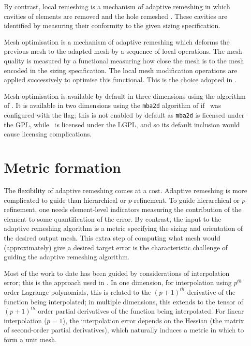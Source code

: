 By contrast, local remeshing is a mechanism of adaptive remeshing in which cavities of elements are removed
and the hole remeshed \citep{hassan1998}. These cavities are identified by measuring
their conformity to the given sizing specification.

Mesh optimisation is a mechanism of adaptive remeshing which deforms the previous mesh
to the adapted mesh by a sequence of local operations.
The mesh quality is measured by a functional measuring how close the mesh is to
the mesh encoded in the sizing specification. The local mesh modification
operations are applied successively to optimise this functional. This is the choice
adopted in \fluidity.

Mesh optimisation is available by default in three dimensions using the algorithm
of \citet{pain2001}. It is available in two dimensions using the \texttt{mba2d} algorithm of
\citet{vasilevskii1999} if \fluidity\ was configured with
the  flag; this is not enabled by default
as \texttt{mba2d} is licensed under the GPL, while \fluidity\ is licensed under the LGPL,
and so its default inclusion would cause licensing complications.

\section{Metric formation} \label{sec:metric_formation}
The flexibility of adaptive remeshing comes at a cost.
Adaptive remeshing is more complicated to guide than hierarchical or $p$-refinement.
To guide hierarchical or $p$-refinement, one needs element-level indicators
measuring the contribution of the element to some quantification of
the error. By contrast, the input to the adaptive remeshing algorithm
is a metric specifying the sizing and orientation of the desired output
mesh. This extra step of computing what mesh would (approximately)
give a desired target error is the characteristic challenge of guiding
the adaptive remeshing algorithm.

Most of the work to date has been guided by considerations of
interpolation error; this is the approach used in \fluidity. In one dimension, for interpolation
using $p^{th}$ order Lagrange polynomials, this is related to the
$(p+1)^{th}$ derivative of the function being interpolated; in multiple
dimensions, this extends to the tensor of $(p+1)^{th}$ order partial
derivatives of the function being interpolated. For linear interpolation
($p=1$), the interpolation error depends on the Hessian (the matrix
of second-order partial derivatives), which naturally induces
a metric in which to form a unit mesh.


